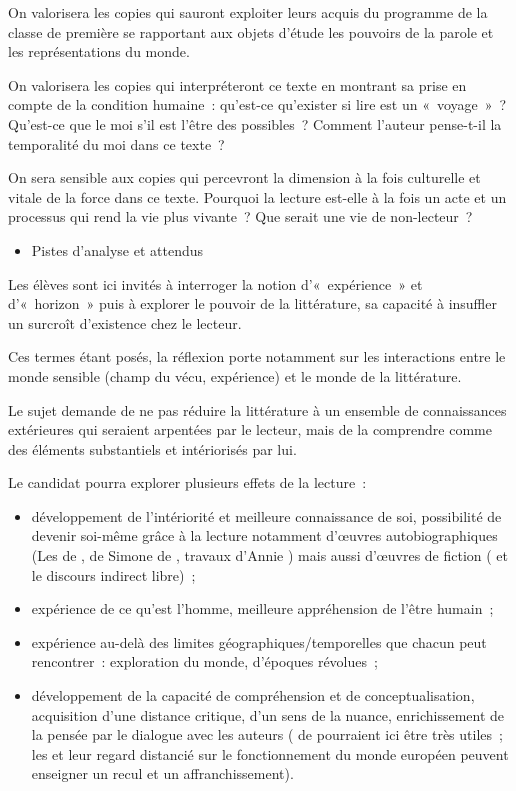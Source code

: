 {On valorisera les copies qui sauront exploiter leurs acquis du programme de la classe
de première se rapportant aux objets d'étude les pouvoirs de la parole et les
représentations du monde.

On valorisera les copies qui interpréteront ce texte en montrant sa prise en compte de
la condition humaine~: qu'est-ce qu'exister si lire est un «~voyage~»~? Qu'est-ce que le
moi s'il est l'être des possibles~? Comment l'auteur pense-t-il la temporalité du moi
dans ce texte~?

On sera sensible aux copies qui percevront la dimension à la fois culturelle et vitale de
la force dans ce texte. Pourquoi la lecture est-elle à la fois un acte et un processus qui
rend la vie plus vivante~? Que serait une vie de non-lecteur~?}%
{\begin{itemize}[label=\textbullet]
\item Pistes d'analyse et attendus
\end{itemize}

Les élèves sont ici invités à interroger la notion d'«~expérience~» et d'«~horizon~» puis
à explorer le pouvoir de la littérature, sa capacité à insuffler un surcroît d'existence
chez le lecteur.

Ces termes étant posés, la réflexion porte notamment sur les interactions entre le
monde sensible (champ du vécu, expérience) et le monde de la littérature.

Le sujet demande de ne pas réduire la littérature à un ensemble de connaissances
extérieures qui seraient arpentées par le lecteur, mais de la comprendre comme des
éléments substantiels et intériorisés par lui.

Le candidat pourra explorer plusieurs effets de la lecture~:
\begin{itemize}
\item développement de l'intériorité et meilleure connaissance de soi, possibilité de devenir
soi-même grâce à la lecture notamment d'œuvres autobiographiques (Les
 de ,  de Simone de ,
travaux d'Annie ) mais aussi d'œuvres de fiction ( et le discours
indirect libre)~;
\item expérience de ce qu'est l'homme, meilleure appréhension de l'être humain~;
\item expérience au-delà des limites géographiques/temporelles que chacun peut
rencontrer~: exploration du monde, d'époques révolues~;
\item développement de la capacité de compréhension et de conceptualisation, acquisition
d'une distance critique, d'un sens de la nuance, enrichissement de la pensée par le
dialogue avec les auteurs ( de  pourraient ici être très utiles~; les
 et leur regard distancié sur le fonctionnement du monde européen
peuvent enseigner un recul et un affranchissement).
\end{itemize}

}
